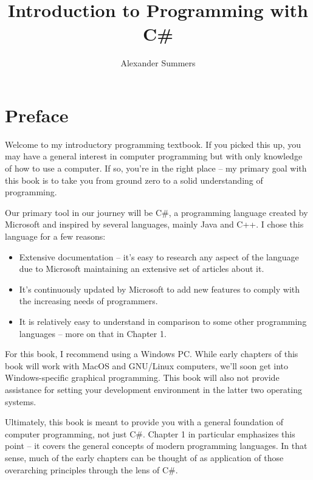 \documentclass[oneside, openany] {book}
\begin{document}


\dominitoc
\title{Introduction to Programming with C\#}
\date{}
\author{Alexander Summers}
\maketitle
\tableofcontents
\frontmatter
\chapter{Preface}

Welcome to my introductory programming textbook. If you picked this up, you may have a general interest in computer programming but with only knowledge of how to use a computer. If so, you're in the right place -- my primary goal with this book is to take you from ground zero to a solid understanding of programming.

Our primary tool in our journey will be C\#, a programming language created by Microsoft and inspired by several languages, mainly Java and C++. I chose this language for a few reasons:

\begin{itemize}
    \item Extensive documentation -- it's easy to research any aspect of the language due to Microsoft maintaining an extensive set of articles about it.
    \item It's continuously updated by Microsoft to add new features to comply with the increasing needs of programmers.
    \item It is relatively easy to understand in comparison to some other programming languages -- more on that in Chapter 1.
\end{itemize}
For this book, I recommend using a Windows PC. While early chapters of this book will work with MacOS and GNU/Linux computers, we'll soon get into Windows-specific graphical programming. This book will also not provide assistance for setting your development environment in the latter two operating systems.

Ultimately, this book is meant to provide you with a general foundation of computer programming, not just C\#. Chapter 1 in particular emphasizes this point -- it covers the general concepts of modern programming languages. In that sense, much of the early chapters can be thought of as application of those overarching principles through the lens of C\#.
\end{document}
